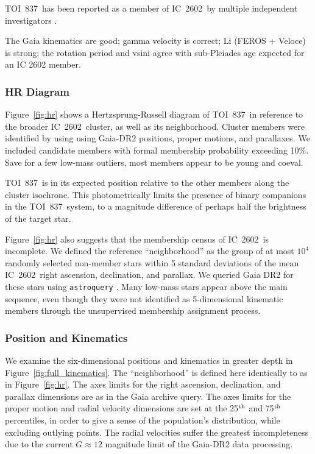 \documentclass[12pt,twocolumn,tighten]{aastex62}
\newcommand{\tn}{TOI~837} %
\newcommand{\cn}{IC~2602} %
\begin{document}
\tn\ has been reported as a member of \cn\ by multiple independent 
investigators \citep{Kharchenko_et_al_2013,cantatgaudin_gaia_2018}.


The Gaia kinematics are good; gamma velocity is correct; Li (FEROS +
Veloce) is strong; the rotation period and vsini agree with
sub-Pleiades age expected for an IC 2602 member.

\subsubsection{HR Diagram}

Figure~\ref{fig:hr} shows a Hertzsprung-Russell diagram of \tn\ in
reference to the broader \cn\ cluster, as well as its neighborhood.
Cluster members were identified by \citet{cantatgaudin_gaia_2018}
using using Gaia-DR2 positions, proper motions, and parallaxes.  
We included candidate members with formal membership probability
exceeding 10\%.  Save for a few low-mass outliers, most members appear
to be young and coeval.

\tn\ is in its expected position relative to the other members along
the cluster isochrone.  This photometrically limits the presence of
binary companions in the \tn\ system, to a magnitude difference of
perhaps half the brightness of the target star.

Figure~\ref{fig:hr} also suggests that the membership census of \cn\
is incomplete.  We defined the reference ``neighborhood'' as the group
of at most $10^4$ randomly selected non-member stars within 5 standard
deviations of the mean \cn\ right ascension, declination, and
parallax.  We queried Gaia DR2 for these stars using
\texttt{astroquery} \citep{astroquery_2018}.  Many low-mass stars
appear above the main sequence, even though they were not identified
as 5-dimensional kinematic members through the unsupervised
\citet{cantat-gaudin_gaia_2018} membership assignment process.


\subsubsection{Position and Kinematics}

We examine the six-dimensional positions and kinematics in greater
depth in Figure~\ref{fig:full_kinematics}.  The ``neighborhood'' is
defined here identically to as in Figure~\ref{fig:hr}.  The axes
limits for the right ascension, declination, and parallax dimensions
are as in the Gaia archive query.  The axes limits for the proper
motion and radial velocity dimensions are set at the 25$^{\rm th}$ and
75$^{\rm th}$ percentiles, in order to give a sense of the
population's distribution, while excluding outlying points.  The
radial velocities suffer the greatest incompleteness due to the
current $G\approx12$ magnitude limit of the Gaia-DR2 data processing.
\end{document}
